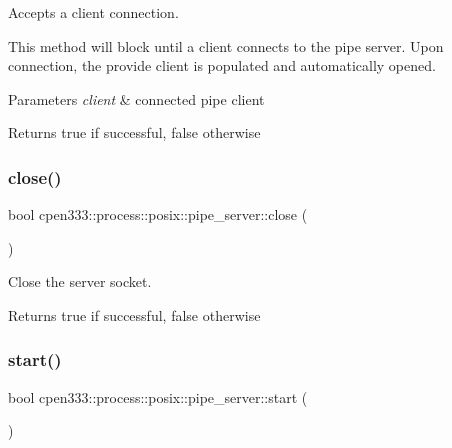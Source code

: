 Accepts a client connection. 

This method will block until a client connects to the pipe server. Upon connection, the provide client is populated and automatically opened.


\begin{DoxyParams}{Parameters}
{\em client} & connected pipe client \\
\hline
\end{DoxyParams}
\begin{DoxyReturn}{Returns}
true if successful, false otherwise 
\end{DoxyReturn}
\mbox{\label{classcpen333_1_1process_1_1posix_1_1pipe__server_a3c13c11fb1ca6cecb65992d11b4fe56a}} 
\subsubsection{\texorpdfstring{close()}{close()}}
{\footnotesize\ttfamily bool cpen333\+::process\+::posix\+::pipe\+\_\+server\+::close (\begin{DoxyParamCaption}{ }\end{DoxyParamCaption})\hspace{0.3cm}{\ttfamily [inline]}}



Close the server socket. 

\begin{DoxyReturn}{Returns}
true if successful, false otherwise 
\end{DoxyReturn}
\mbox{\label{classcpen333_1_1process_1_1posix_1_1pipe__server_ae155615a438deba2ee73f0f92cd3f992}} 
\subsubsection{\texorpdfstring{start()}{start()}}
{\footnotesize\ttfamily bool cpen333\+::process\+::posix\+::pipe\+\_\+server\+::start (\begin{DoxyParamCaption}{ }\end{DoxyParamCaption})\hspace{0.3cm}{\ttfamily [inline]}}



